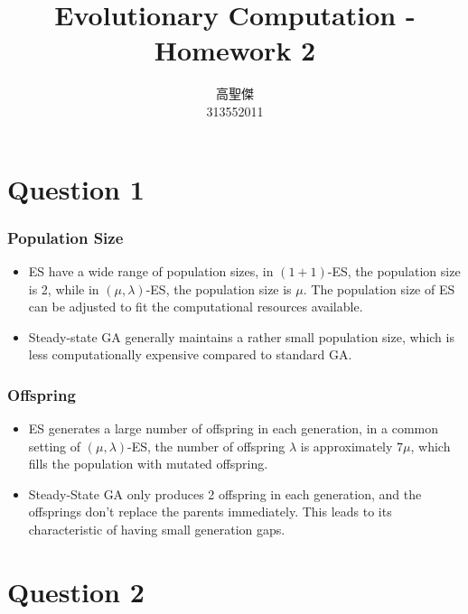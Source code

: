 \documentclass[12pt,letterpaper]{article}
\begin{document}
\begin{CJK}{UTF8}{bkai}
    \title{Evolutionary Computation - Homework 2}

    \author{
        高聖傑\\
        313552011\\
    }

    \maketitle
\end{CJK}

\section*{Question 1}

\subsubsection*{Population Size}
\begin{itemize}
    \item ES have a wide range of population sizes, in $(1+1)$-ES, the population size is 2, while in $(\mu, \lambda)$-ES, the population size is $\mu$. The population size of ES can be adjusted to fit the computational resources available.
    \item Steady-state GA generally maintains a rather small population size, which is less computationally expensive compared to standard GA.
\end{itemize}

\subsubsection*{Offspring}
\begin{itemize}
    \item ES generates a large number of offspring in each generation, in a common setting of $(\mu, \lambda)$-ES, the number of offspring $\lambda$ is approximately $7\mu$, which fills the population with mutated offspring. 
    \item Steady-State GA only produces 2 offspring in each generation, and the offsprings don't replace the parents immediately. This leads to its characteristic of having small generation gaps.
\end{itemize}

\section*{Question 2}
\end{document}

